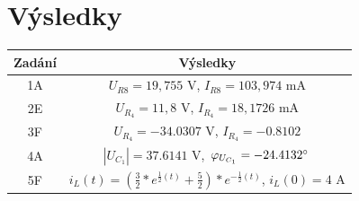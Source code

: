 \documentclass[12pt]{article}
\begin{document}
\section{Výsledky}
\vspace{30px}
\begin{center}

{\tabulinesep=1.2mm
\begin{tabu} {|c|c|}\hline
Zadání & Výsledky\\ \hline
1A & $U_{R8} = 19,755$ V, $I_{R8} = 103,974$ mA\\
\hline
2E & $U_{R_{4}} = 11,8$ V, $I_{R_{4}} = 18,1726$ mA\\
\hline
3F & $U_{R_4} = -34.0307$ V, $I_{R_4} = -0.8102$\\
\hline
4A & $|U_{C_1}| = 37.6141$ V, $\varphi_{U_{C_1}} = -24.4132\degree$\\
\hline
5F & $i_L(t) = (\frac{3}{2} * e^{\frac{1}{2}(t)} + \frac{5}{2}) * e^{-\frac{1}{2}(t)}$, $i_L(0) = 4$ A\\ \hline       
\end{tabu}}
\end{center}
\end{document}
